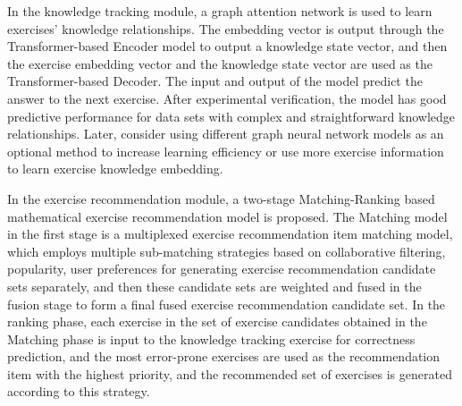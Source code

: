In the knowledge tracking module, a graph attention network is used to learn exercises' knowledge relationships. The embedding vector is output through the Transformer-based Encoder model to output a knowledge state vector, and then the exercise embedding vector and the knowledge state vector are used as the Transformer-based Decoder. The input and output of the model predict the answer to the next exercise. After experimental verification, the model has good predictive performance for data sets with complex and straightforward knowledge relationships. Later, consider using different graph neural network models as an optional method to increase learning efficiency or use more exercise information to learn exercise knowledge embedding.


In the exercise recommendation module, a two-stage Matching-Ranking based mathematical exercise recommendation model is proposed. The Matching model in the first stage is a multiplexed exercise recommendation item matching model, which employs multiple sub-matching strategies based on collaborative filtering, popularity, user preferences for generating exercise recommendation candidate sets separately, and then these candidate sets are weighted and fused in the fusion stage to form a final fused exercise recommendation candidate set. In the ranking phase, each exercise in the set of exercise candidates obtained in the Matching phase is input to the knowledge tracking exercise for correctness prediction, and the most error-prone exercises are used as the recommendation item with the highest priority, and the recommended set of exercises is generated according to this strategy.

